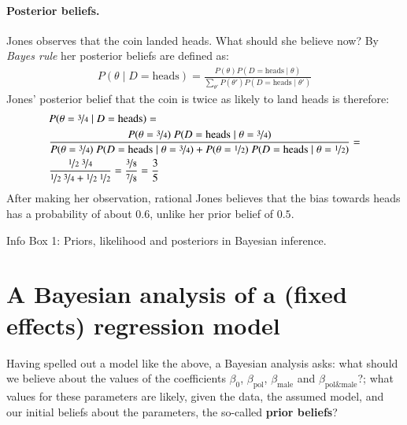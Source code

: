 \documentclass[nobib]{tufte-handout}
\begin{document}
\begin{InfoBox}[]
{\begin{minipage}{1.0\textwidth}
    \paragraph{Posterior beliefs.} Jones observes that the coin landed heads. What should she
    believe now? By \emph{Bayes rule} her posterior beliefs are defined as:
    \begin{align*}
      P(\theta \mid D = \text{heads}) = \frac{P(\theta) P(D = \text{heads} \mid \theta)}{\sum_{\theta'}P(\theta') P(D = \text{heads} \mid \theta')}
    \end{align*}
    Jones' posterior belief that the coin is twice as likely to land heads is therefore:
    \begin{align*}
      & P(\theta = \nicefrac{3}{4} \mid D = \text{heads}) =  \\
      & \frac{P(\theta = \nicefrac{3}{4}) \ P(D = \text{heads} \mid \theta = \nicefrac{3}{4})}{P(\theta = \nicefrac{3}{4}) \ P(D = \text{heads} \mid \theta = \nicefrac{3}{4}) + P(\theta = \nicefrac{1}{2}) \ P(D = \text{heads} \mid \theta = \nicefrac{1}{2})} = \\
      & \frac{\nicefrac{1}{2} \ \nicefrac{3}{4}}{\nicefrac{1}{2} \ \nicefrac{3}{4} + \nicefrac{1}{2} \ \nicefrac{1}{2}} = \frac{\nicefrac{3}{8}}{\nicefrac{7}{8}} = \frac{3}{5} 
    \end{align*}
    After making her observation, rational Jones believes that the bias towards heads has a
    probability of about $0.6$, unlike her prior belief of $0.5$.
    
  \end{minipage} \par
  } \par
  \begin{center}
    Info Box 1: Priors, likelihood and posteriors in Bayesian inference.
  \end{center}
\end{InfoBox}


\section{A Bayesian analysis of a (fixed effects) regression model}

Having spelled out a model like the above, a Bayesian analysis asks: what should we
believe about the values of the coefficients $\beta_0$, $\beta_{\text{pol}}$,
$\beta_{\text{male}}$ and $\beta_{\text{pol\&male}}$?; what values for these parameters are
likely, given the data, the assumed model, and our initial beliefs about the parameters, the
so-called \textbf{prior beliefs}?
%
%
%
\end{document}
